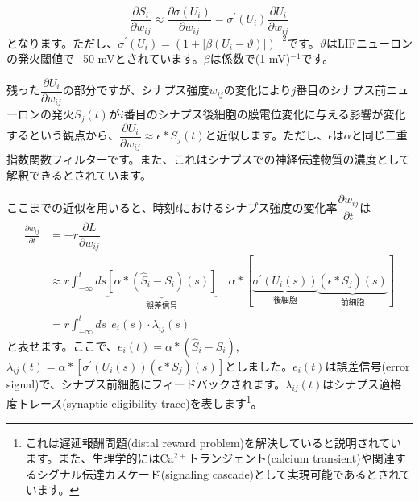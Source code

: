 \begin{equation}
\frac{\partial S_{i}}{\partial w_{ij}}\approx\frac{\partial \sigma\left(U_{i}\right)}{\partial w_{ij}}=\sigma^{\prime}\left(U_{i}\right) \frac{\partial U_{i}}{\partial w_{i j}}    
\end{equation}
となります。ただし、$\sigma^{\prime}\left(U_{i}\right)=(1+|\beta(U_i-\vartheta)|)^{-2}$です。$\vartheta$はLIFニューロンの発火閾値で$-$50 mVとされています。$\beta$は係数で(1 mV)$^{-1}$です。\par
残った$\dfrac{\partial U_{i}}{\partial w_{i j}}$の部分ですが、シナプス強度$w_{ij}$の変化により$j$番目のシナプス前ニューロンの発火$S_j(t)$が$i$番目のシナプス後細胞の膜電位変化に与える影響が変化するという観点から、$\dfrac{\partial U_{i}}{\partial w_{i j}}\approx \epsilon* S_j(t)$と近似します。ただし、$\epsilon$は$\alpha$と同じ二重指数関数フィルターです。また、これはシナプスでの神経伝達物質の濃度として解釈できるとされています。\par
ここまでの近似を用いると、時刻$t$におけるシナプス強度の変化率$\dfrac{\partial w_{ij}}{\partial t}$は
\begin{align}
\frac{\partial w_{ij}}{\partial t}&=-r \dfrac{\partial L}{\partial w_{i j}}\\
&\approx r\int_{-\infty}^{t} ds\underbrace{\left[\alpha * \left(\hat{S}_{i}-S_{i}\right)(s)\right]}_{誤差信号}\quad\alpha *\left[ \underbrace{\sigma^{\prime}\left(U_{i}(s)\right)}_{後細胞}\underbrace{\left(\epsilon * S_{j}\right)(s)}_{前細胞}\right]\\
&=r\int_{-\infty}^{t} ds\ \ e_i(s)\cdot \lambda_{ij}(s)
\end{align}
と表せます。ここで、$e_i(t)=\alpha * \left(\hat{S}_{i}-S_{i}\right)$, $\lambda_{ij}(t)=\alpha *\left[\sigma^{\prime}\left(U_{i}(s)\right)\left(\epsilon * S_{j}\right)(s)\right]$としました。$e_i(t)$は誤差信号(error signal)で、シナプス前細胞にフィードバックされます。$\lambda_{ij}(t)$はシナプス適格度トレース(synaptic eligibility trace)を表します\footnote{これは遅延報酬問題(distal reward problem)を解決していると説明されています。また、生理学的にはCa$^{2+}$トランジェント(calcium transient)や関連するシグナル伝達カスケード(signaling cascade)として実現可能であるとされています。}。\par
